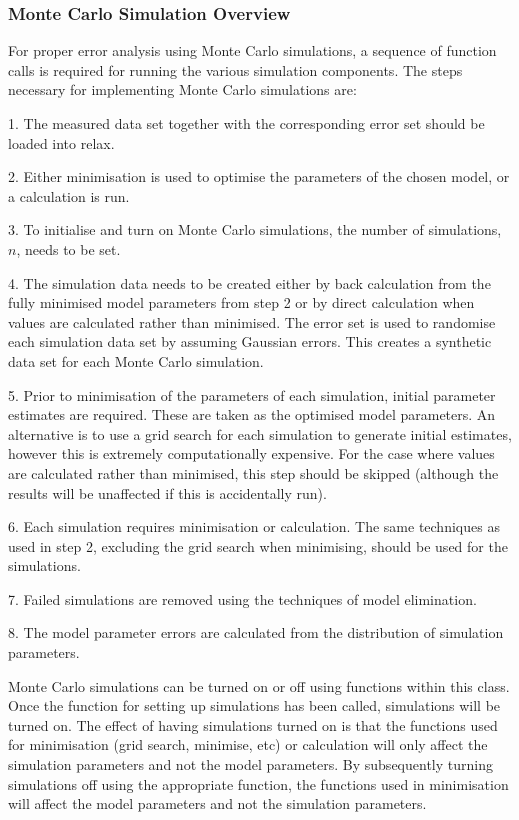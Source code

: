 \subsubsection{Monte Carlo Simulation Overview}

For proper error analysis using Monte Carlo simulations, a sequence of function calls is required for running the various simulation components.  The steps necessary for implementing Monte Carlo simulations are:


1.  The measured data set together with the corresponding error set should be loaded into relax.


2.  Either minimisation is used to optimise the parameters of the chosen model, or a calculation is run.


3.  To initialise and turn on Monte Carlo simulations, the number of simulations, $n$, needs to be set.


4.  The simulation data needs to be created either by back calculation from the fully minimised model parameters from step 2 or by direct calculation when values are calculated rather than minimised.  The error set is used to randomise each simulation data set by assuming Gaussian errors.  This creates a synthetic data set for each Monte Carlo simulation.


5.  Prior to minimisation of the parameters of each simulation, initial parameter estimates are required.  These are taken as the optimised model parameters.  An alternative is to use a grid search for each simulation to generate initial estimates, however this is extremely computationally expensive.  For the case where values are calculated rather than minimised, this step should be skipped (although the results will be unaffected if this is accidentally run).


6.  Each simulation requires minimisation or calculation.  The same techniques as used in step 2, excluding the grid search when minimising, should be used for the simulations.


7.  Failed simulations are removed using the techniques of model elimination.


8.  The model parameter errors are calculated from the distribution of simulation parameters.


Monte Carlo simulations can be turned on or off using functions within this class.  Once the function for setting up simulations has been called, simulations will be turned on.  The effect of having simulations turned on is that the functions used for minimisation (grid search, minimise, etc) or calculation will only affect the simulation parameters and not the model parameters.  By subsequently turning simulations off using the appropriate function, the functions used in minimisation will affect the model parameters and not the simulation parameters.



